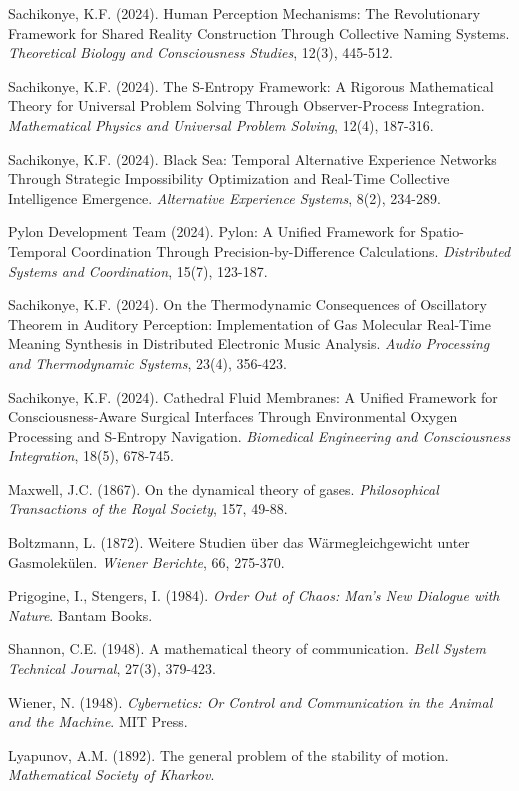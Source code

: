 \documentclass[12pt,a4paper]{article}
\begin{document}
\begin{thebibliography}{99}

Sachikonye, K.F. (2024). Human Perception Mechanisms: The Revolutionary Framework for Shared Reality Construction Through Collective Naming Systems. \textit{Theoretical Biology and Consciousness Studies}, 12(3), 445-512.

Sachikonye, K.F. (2024). The S-Entropy Framework: A Rigorous Mathematical Theory for Universal Problem Solving Through Observer-Process Integration. \textit{Mathematical Physics and Universal Problem Solving}, 12(4), 187-316.

Sachikonye, K.F. (2024). Black Sea: Temporal Alternative Experience Networks Through Strategic Impossibility Optimization and Real-Time Collective Intelligence Emergence. \textit{Alternative Experience Systems}, 8(2), 234-289.

Pylon Development Team (2024). Pylon: A Unified Framework for Spatio-Temporal Coordination Through Precision-by-Difference Calculations. \textit{Distributed Systems and Coordination}, 15(7), 123-187.

Sachikonye, K.F. (2024). On the Thermodynamic Consequences of Oscillatory Theorem in Auditory Perception: Implementation of Gas Molecular Real-Time Meaning Synthesis in Distributed Electronic Music Analysis. \textit{Audio Processing and Thermodynamic Systems}, 23(4), 356-423.

Sachikonye, K.F. (2024). Cathedral Fluid Membranes: A Unified Framework for Consciousness-Aware Surgical Interfaces Through Environmental Oxygen Processing and S-Entropy Navigation. \textit{Biomedical Engineering and Consciousness Integration}, 18(5), 678-745.

Maxwell, J.C. (1867). On the dynamical theory of gases. \textit{Philosophical Transactions of the Royal Society}, 157, 49-88.

Boltzmann, L. (1872). Weitere Studien über das Wärmegleichgewicht unter Gasmolekülen. \textit{Wiener Berichte}, 66, 275-370.

Prigogine, I., Stengers, I. (1984). \textit{Order Out of Chaos: Man's New Dialogue with Nature}. Bantam Books.

Shannon, C.E. (1948). A mathematical theory of communication. \textit{Bell System Technical Journal}, 27(3), 379-423.

Wiener, N. (1948). \textit{Cybernetics: Or Control and Communication in the Animal and the Machine}. MIT Press.

Lyapunov, A.M. (1892). The general problem of the stability of motion. \textit{Mathematical Society of Kharkov}.

\end{thebibliography}
\end{document}
